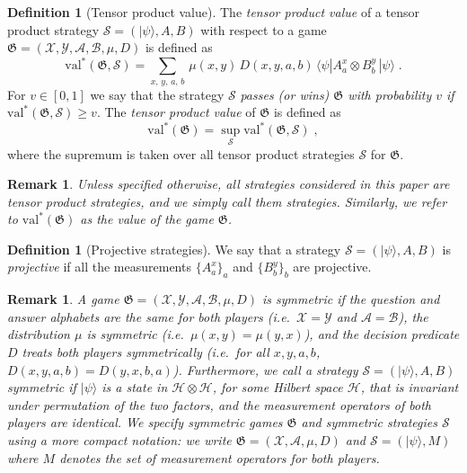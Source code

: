 \documentclass[11pt]{article}
\newtheorem{remark}[theorem]{Remark}
\theoremstyle{definition}
\newtheorem{definition}[theorem]{Definition}
\newcommand{\ket}[1]{|#1\rangle}
\newcommand{\bra}[1]{\langle#1|}
\newcommand{\mH}{\ensuremath{\mathcal{H}}}
\newcommand{\val}{\ensuremath{\mathrm{val}}}
\newcommand{\game}{\mathfrak{G}}
\newcommand{\strategy}{\mathscr{S}}
\renewcommand{\cal}[1]{\mathcal{#1}}
\begin{document}
\begin{definition}[Tensor product value]
  \label{def:tensor-product-value}
	The \emph{tensor product value} of a tensor product strategy $\strategy =
  (\ket{\psi}, A, B)$  with respect to a game $\game=(\cal{X}, \cal{Y}, \cal{A},
  \cal{B}, \mu, D)$ is defined as
  \begin{equation*}
		\val^*(\game, \strategy) = \sum_{x,\, y,\, a,\, b} \, \mu(x,y)\, D(x,y,a,b)\,
    \bra{\psi} A^x_a \otimes B^y_b\, \ket{\psi}\;.
  \end{equation*}
	For $v\in[0,1]$ we say that the strategy $\strategy$ \emph{passes (or wins) $\game$ with
    probability $v$ if} $\val^*(\game, \strategy) \geq v$.
  The \emph{tensor product value} of $\game$ is defined as
  \begin{equation*}
		\val^*(\game) = \sup_\strategy \val^*(\game, \strategy)\;,
  \end{equation*}
	where the supremum is taken over all tensor product strategies $\strategy$ for
  $\game$.
\end{definition}


\begin{remark}
  Unless specified otherwise, all strategies considered in this paper are tensor
  product strategies, and we simply call them \emph{strategies}.
  Similarly, we refer to $\val^*(\game)$ as the \emph{value} of the game
  $\game$.
\end{remark}


\begin{definition}[Projective strategies]
  \label{def:projective-strategy}
  We say that a strategy $\strategy = (\ket{\psi}, A, B)$ is \emph{projective} if
  all the measurements $\{A^x_a\}_a$ and $\{B^y_b\}_b$ are projective.
\end{definition}




\begin{remark}\label{rem:symmetric-games}
	A game $\game = (\cal{X}, \cal{Y}, \cal{A}, \cal{B}, \mu, D)$ is
  \emph{symmetric} if the question and answer alphabets are the same for both
  players (i.e.\
  $\cal{X} = \cal{Y}$ and $\cal{A} = \cal{B}$), the distribution $\mu$ is
  symmetric (i.e.\
  $\mu(x,y) = \mu(y,x)$), and the decision predicate $D$ treats both players
  symmetrically (i.e.\ for all $x,y,a,b$, $D(x,y,a,b) = D(y,x,b,a)$).
  Furthermore, we call a strategy $\strategy = (\ket{\psi}, A, B)$
  \emph{symmetric} if $\ket{\psi}$ is a state in $\mH \otimes \mH$, for some
  Hilbert space $\mH$, that is invariant under permutation of the two factors,
  and the measurement operators of both players are identical.
  We specify symmetric games $\game$ and symmetric strategies $\strategy$ using
  a more compact notation: we write $\game = (\cal{X}, \cal{A}, \mu, D)$ and
  $\strategy = (\ket{\psi}, M)$ where $M$ denotes the set of measurement
  operators for both players.
\end{remark}
\end{document}

